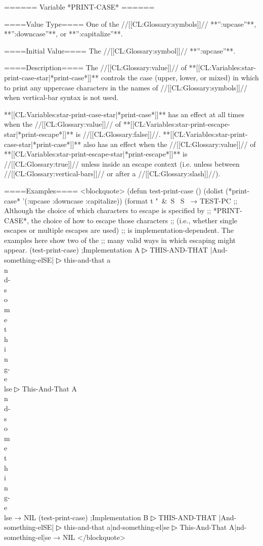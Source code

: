 ====== Variable *PRINT-CASE* ======

====Value Type====
One of the //[[CL:Glossary:symbols]]// **'':upcase''**, **'':downcase''**, or **'':capitalize''**.

====Initial Value====
The //[[CL:Glossary:symbol]]// **'':upcase''**.

====Description====
The //[[CL:Glossary:value]]// of **[[CL:Variables:star-print-case-star|*print-case*]]** controls the case (upper, lower, or mixed) in which to print any uppercase characters in the names of //[[CL:Glossary:symbols]]// when vertical-bar syntax is not used.

**[[CL:Variables:star-print-case-star|*print-case*]]** has an effect at all times when the //[[CL:Glossary:value]]// of **[[CL:Variables:star-print-escape-star|*print-escape*]]** is //[[CL:Glossary:false]]//. **[[CL:Variables:star-print-case-star|*print-case*]]** also has an effect when the //[[CL:Glossary:value]]// of **[[CL:Variables:star-print-escape-star|*print-escape*]]** is //[[CL:Glossary:true]]// unless inside an escape context (i.e. unless between //[[CL:Glossary:vertical-bars]]// or after a //[[CL:Glossary:slash]]//).

====Examples====
<blockquote> (defun test-print-case () (dolist (*print-case* '(:upcase :downcase :capitalize)) (format t "~&~S ~S~ → TEST-PC ;; Although the choice of which characters to escape is specified by ;; *PRINT-CASE*, the choice of how to escape those characters ;; (i.e., whether single escapes or multiple escapes are used) ;; is implementation-dependent. The examples here show two of the ;; many valid ways in which escaping might appear. (test-print-case) ;Implementation A
▷ THIS-AND-THAT |And-something-elSE|
▷ this-and-that a\\n\\d-\\s\\o\\m\\e\\t\\h\\i\\n\\g-\\e\\lse
▷ This-And-That A\\n\\d-\\s\\o\\m\\e\\t\\h\\i\\n\\g-\\e\\lse → NIL (test-print-case) ;Implementation B
▷ THIS-AND-THAT |And-something-elSE|
▷ this-and-that a|nd-something-el|se
▷ This-And-That A|nd-something-el|se → NIL </blockquote>

